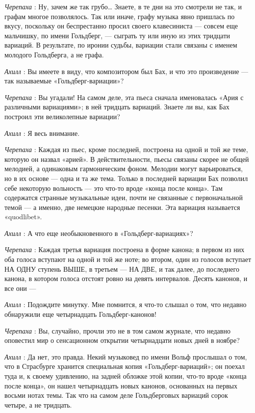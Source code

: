 \documentclass[../main.tex]{subfiles}
\begin{document}
\begin{dialogue}
\emph{Черепаха} : Ну, зачем же так грубо\ldots{} Знаете, в те дни на это смотрели не так, и графам многое позволялось. Так или иначе, графу музыка явно пришлась по вкусу, поскольку он беспрестанно просил своего клавесиниста --- совсем еще мальчишку, по имени Гольдберг, --- сыграть ту или иную из этих тридцати вариаций. В результате, по иронии судьбы, вариации стали связаны с именем молодого Гольдберга, а не графа.

\emph{Ахилл} : Вы имеете в виду, что композитором был Бах, и что это произведение --- так называемые «Гольдберг-вариации»?

\emph{Черепаха} : Вы угадали! На самом деле, эта пьеса сначала именовалась «Ария с различными вариациями»; в ней тридцать вариаций. Знаете ли вы, как Бах построил эти великолепные вариации?

\emph{Ахилл} : Я весь внимание.

\emph{Черепаха} : Каждая из пьес, кроме последней, построена на одной и той же теме, которую он назвал «арией». В действительности, пьесы связаны скорее не общей мелодией, а одинаковым гармоническим фоном. Мелодии могут варьироваться, но в их основе --- одна и та же тема. Только в последней вариации Бах позволил себе некоторую вольность --- это что-то вроде «конца после конца». Там содержатся странные музыкальные идеи, почти не связанные с первоначальной темой --- а именно, две немецкие народные песенки. Эта вариация называется «quodlibet».

\emph{Ахилл} : А что еще необыкновенного в «Гольдберг-вариациях»?

\emph{Черепаха} : Каждая третья вариация построена в форме канона; в первом из них оба голоса вступают на одной и той же ноте; во втором, один из голосов вступает НА ОДНУ ступень ВЫШЕ, в третьем --- НА ДВЕ, и так далее, до последнего канона, в котором голоса отстоят ровно на девять интервалов. Десять канонов, и все они ---

\emph{Ахилл} : Подождите минутку. Мне помнится, я что-то слышал о том, что недавно обнаружили еще четырнадцать Гольдберг-канонов!

\emph{Черепаха} : Вы, случайно, прочли это не в том самом журнале, что недавно оповестил мир о сенсационном открытии четырнадцати новых дней в ноябре?

\emph{Ахилл} : Да нет, это правда. Некий музыковед по имени Вольф прослышал о том, что в Страсбурге хранится специальная копия «Гольдберг-вариаций»; он поехал туда и, к своему удивлению, на задней обложке этой копии, что-то вроде «конца после конца», он нашел четырнадцать новых канонов, основанных на первых восьми нотах темы. Так что на самом деле Гольдберговых вариаций сорок четыре, а не тридцать.


\end{dialogue}
\end{document}
